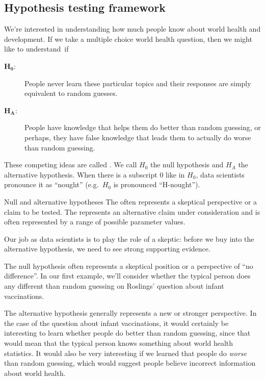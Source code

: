\subsection{Hypothesis testing framework}

We’re interested in understanding how much people know
about world health and development.
If we take a multiple choice
world health question, then we might like to understand~if
\begin{description}
\item[$\mathbf{H_0}$:]
    People never learn these particular topics and their
    responses are simply equivalent to random guesses.
\item[$\mathbf{H_A}$:]
    People have knowledge that helps them do better
    than random guessing, or perhaps, they have false knowledge
    that leads them to actually do worse than random guessing.
\end{description}
These competing ideas are called .
We call $H_0$ the null hypothesis and $H_A$ the alternative
hypothesis.
When there is a subscript 0 like in $H_0$,
data scientists pronounce it as ``nought''
(e.g.~$H_0$ is pronounced ``H-nought'').

\begin{onebox}{Null and alternative hypotheses}
  The  often represents
  a skeptical perspective or a claim to be tested.
  The  represents an
  alternative claim under consideration and is often
  represented by a range of possible parameter values.
  \stdvspace{}
  
  Our job as data scientists is to play the role of a skeptic:
  before we buy into the alternative hypothesis, we need to
  see strong supporting evidence.
\end{onebox}

The null hypothesis often represents a skeptical position
or a perspective of ``no difference''.
In our first example, we'll consider whether
the typical person does any different than random guessing
on Roslings' question about infant vaccinations.

The alternative hypothesis generally represents a new
or stronger perspective. In the case of the question
about infant vaccinations,
it would certainly be interesting to learn whether
people do better than random guessing, since that would
mean that the typical person knows something about
world health statistics.
It would also be very interesting if we learned
that people do \emph{worse} than random guessing,
which would suggest people believe
incorrect information about world health.

